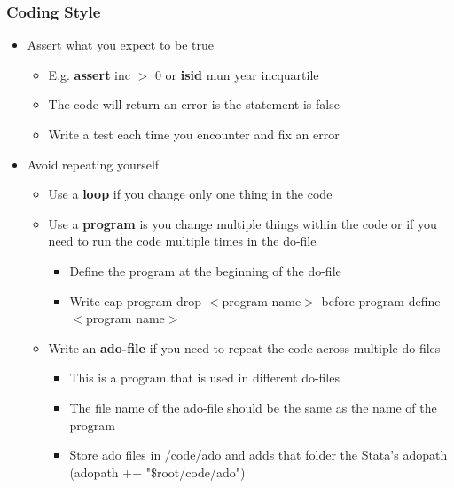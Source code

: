 \documentclass{beamer}
\begin{document}
{
	\frametitle{Coding Style}
	
	\begin{itemize}
		\item Assert what you expect to be true 
		\begin{itemize}
			\item E.g. \textbf{assert} inc $>$ 0 or \textbf{isid} mun year incquartile 
			\item The code will return an error is the statement is false
			\item Write a test each time you encounter and fix an error 
		\end{itemize}
	
	\item Avoid repeating yourself
	\begin{itemize}
		\item Use a \textbf{loop} if you change only one thing in the code
		\item Use a \textbf{program} is you change multiple things within the code or if you need to run the code multiple times in the do-file
		\begin{itemize}
			\item Define the program at the beginning of the do-file
			\item Write cap program drop $<$program name$>$ before  program define $<$program name$>$
		\end{itemize}
		\item Write an \textbf{ado-file} if you need to repeat the code across multiple do-files
		\begin{itemize}
			\item This is a program that is used in different do-files
			\item The file name of the ado-file should be the same as the name of the program
			\item Store ado files in /code/ado and adds that folder the Stata's adopath	(adopath ++ "\$root/code/ado")
		\end{itemize}
	\end{itemize}
	\end{itemize}	
	
}
\frame
\end{document}
